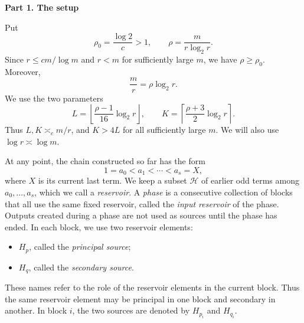\documentclass{article}
\theoremstyle{definition}
\begin{document}
\vskip 10pt

\noindent
{\bf Part 1. The setup}

Put
$$
\rho_0=\frac{\log 2}{c}>1,
\qquad
\rho=\frac{m}{r\log_2r}.
$$
Since $r\le cm/\log m$ and $r<m$ for sufficiently large $m$,
we have $\rho\ge\rho_0$. Moreover,
\begin{equation}
\frac mr=\rho\log_2r.
\label{eq:F-new-m-over-r}
\end{equation}
We use the two parameters
\begin{equation}
L=\left\lfloor\frac{\rho-1}{16}\log_2r\right\rfloor,
\qquad
K=\left\lceil\frac{\rho+3}{2}\log_2r\right\rceil.
\label{eq:F-new-parameters}
\end{equation}
Thus $L,K\asymp_c m/r$, and $K>4L$ for all sufficiently
large $m$. We will also use $\log r\asymp\log m$.

At any point, the chain constructed so far has the form
$$
 1=a_0<a_1<\cdots<a_s=X,
$$
where $X$ is its current last term.  We keep a subset $\mathcal H$ of
earlier odd terms among $a_0,\ldots,a_s$, which we call a 
\emph{reservoir}. A \emph{phase} is a consecutive collection of blocks that all use the same fixed
reservoir, called the \emph{input reservoir} of the phase. Outputs created
during a phase are not used as sources until the phase has ended. In each block, we use two reservoir elements:
\begin{itemize}
\item $H_p$, called the \emph{principal source};
\item $H_q$, called the \emph{secondary source}.
\end{itemize}
These names refer to the role of the reservoir elements in the current block. Thus the same reservoir element may be principal in
one block and secondary in another.  In block $i$, the two sources are
denoted by $H_{p_i}$ and $H_{q_i}$.
\end{document}
